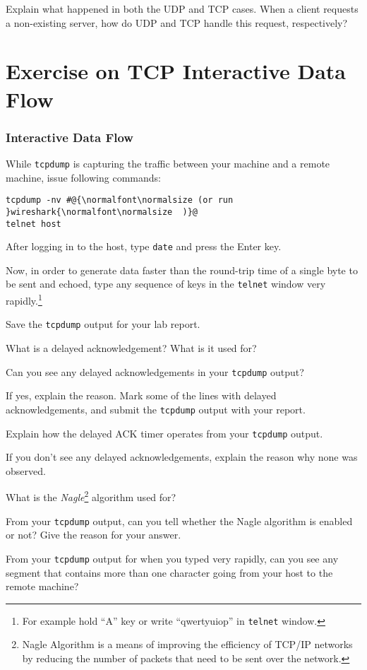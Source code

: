 \documentclass{../UTNetLab}
\begin{document}
    \begin{report}
        \item Explain what happened in both the UDP and TCP cases. When a client requests a non-existing server, how do UDP and TCP handle this request, respectively?
    \end{report}

\part{Exercise on TCP Interactive Data Flow}
\section{Interactive Data Flow}
While \lstinline{tcpdump} is capturing the traffic between your machine and a remote machine, issue following commands:
    \begin{lstlisting}[emph={host}]
tcpdump -nv #@{\normalfont\normalsize (or run }wireshark{\normalfont\normalsize  )}@
telnet host
    \end{lstlisting}
    After logging in to the host, type \lstinline{date} and press the {Enter} key.

    Now, in order to generate data faster than the round-trip time of a single byte to be sent and echoed, type any sequence of keys in the \lstinline{telnet} window very rapidly.\footnote{For example hold ``A'' key or write ``qwertyuiop'' in \lstinline{telnet} window.}

    {Save} the \lstinline{tcpdump} output for your lab report.
    
    \begin{report}
    \item What is a delayed acknowledgement?
    What is it used for?
    
    \item Can you see any delayed acknowledgements in your \lstinline{tcpdump} output?

    If yes, explain the reason.
    Mark some of the lines with delayed acknowledgements, and submit the \lstinline{tcpdump} output with your report.

    Explain how the delayed ACK timer operates from your \lstinline{tcpdump} output.

    If you don’t see any delayed acknowledgements, explain the reason why none was observed.
    
    \item What is the \textit{Nagle}\footnote{Nagle Algorithm is a means of improving the efficiency of TCP/IP networks by reducing the number of packets that need to be sent over the network.} algorithm used for?

    From your \lstinline{tcpdump} output, can you tell whether the Nagle algorithm is enabled or not? Give the reason for your answer.

    From your \lstinline{tcpdump} output for when you typed very rapidly, can you see any segment that contains more than one character going from your host to the remote machine?
    \end{report}
\end{document}
